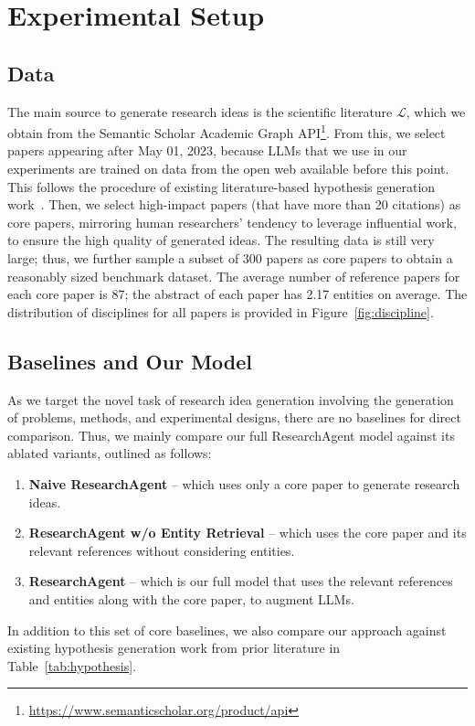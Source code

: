 \documentclass[11pt]{article}
\begin{document}


\section{Experimental Setup}
\label{sec:setups}

\subsection{Data}
The main source to generate research ideas is the scientific literature $\mathcal{L}$, which we obtain from the Semantic Scholar Academic Graph API\footnote{\href{https://www.semanticscholar.org/product/api}{https://www.semanticscholar.org/product/api}}. From this, we select papers appearing after May 01, 2023, because LLMs that we use in our experiments are trained on data from the open web available before this point. This follows the procedure of existing literature-based hypothesis generation work~\cite{zeroshot/hypothesis}. Then, we select high-impact papers (that have more than 20 citations) as core papers, mirroring human researchers' tendency to leverage influential work, to ensure the high quality of generated ideas. The resulting data is still very large; thus, we further sample a subset of 300 papers as core papers to obtain a reasonably sized benchmark dataset. The average number of reference papers for each core paper is 87; the abstract of each paper has 2.17 entities on average. The distribution of disciplines for all papers is provided in Figure~\ref{fig:discipline}.

\subsection{Baselines and Our Model}
As we target the novel task of research idea generation involving the generation of problems, methods, and experimental designs, there are no baselines for direct comparison. Thus, we mainly compare our full ResearchAgent model against its ablated variants, outlined as follows:
\begin{enumerate}[itemsep=1.0mm, parsep=1pt, leftmargin=*]
    \item {\bf Naive ResearchAgent} -- which uses only a core paper to generate research ideas. 
    \item {\bf ResearchAgent w/o Entity Retrieval} -- which uses the core paper and its relevant references without considering entities.
    \item {\bf ResearchAgent} -- which is our full model that uses the relevant references and entities along with the core paper, to augment LLMs.
\end{enumerate}
In addition to this set of core baselines, we also compare our approach against existing hypothesis generation work from prior literature in Table~\ref{tab:hypothesis}.
\end{document}
